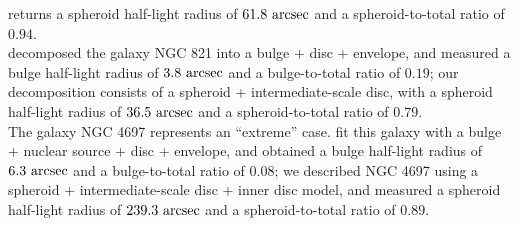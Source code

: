 \documentclass[useAMS,usenatbib,article]{mn2e}
\begin{document}
returns a spheroid half-light radius of $61.8~\rm arcsec$ and a spheroid-to-total ratio of $0.94$. \\
\cite{lasker2014data} decomposed the galaxy NGC 821 into a bulge + disc + envelope, 
and measured a bulge half-light radius of $3.8~\rm arcsec$ and a bulge-to-total ratio of $0.19$; 
our decomposition consists of a spheroid + intermediate-scale disc, 
with a spheroid half-light radius of $36.5~\rm arcsec$ and a spheroid-to-total ratio of $0.79$. \\
The galaxy NGC 4697 represents an ``extreme'' case. 
\cite{lasker2014data} fit this galaxy with a bulge + nuclear source + disc + envelope, 
and obtained a bulge half-light radius of $6.3~\rm arcsec$ and a bulge-to-total ratio of $0.08$; 
we described NGC 4697 using a spheroid + intermediate-scale disc + inner disc model, 
and measured a spheroid half-light radius of $239.3~\rm arcsec$ and a spheroid-to-total ratio of $0.89$.
\end{document}
